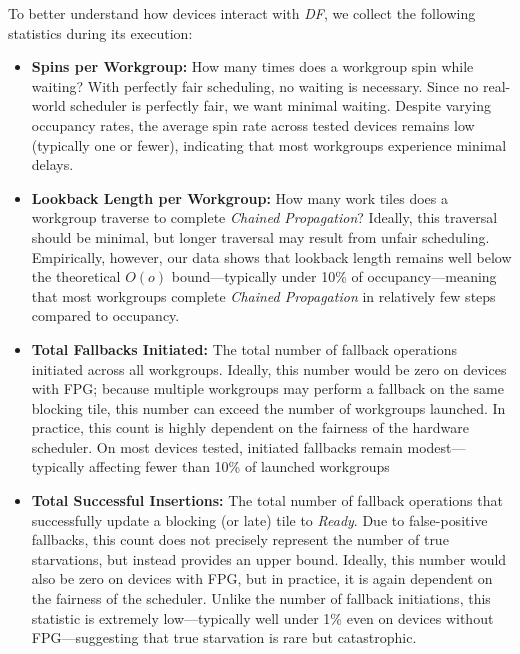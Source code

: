 \documentclass[sigconf,screen]{acmart}
\begin{document}
To better understand how devices interact with \emph{DF}, we collect the following statistics during its execution:
\begin{itemize}
  \item \textbf{Spins per Workgroup:} How many times does a workgroup spin while waiting? With perfectly fair scheduling, no waiting is necessary. Since no real-world scheduler is perfectly fair, we want minimal waiting. Despite varying occupancy rates, the average spin rate across tested devices remains low (typically one or fewer), indicating that most workgroups experience minimal delays.

  \item \textbf{Lookback Length per Workgroup:} How many work tiles does a workgroup traverse to complete \emph{Chained Propagation}? Ideally, this traversal should be minimal, but longer traversal may result from unfair scheduling. Empirically, however, our data shows that lookback length remains well below the theoretical $O(o)$ bound---typically under 10\% of occupancy---meaning that most workgroups complete \emph{Chained Propagation} in relatively few steps compared to occupancy.

  \item \textbf{Total Fallbacks Initiated:} The total number of fallback operations initiated across all workgroups. Ideally, this number would be zero on devices with FPG\@; because multiple workgroups may perform a fallback on the same blocking tile, this number can exceed the number of workgroups launched. In practice, this count is highly dependent on the fairness of the hardware scheduler. On most devices tested, initiated fallbacks remain modest---typically affecting fewer than 10\% of launched workgroups

  \item \textbf{Total Successful Insertions:} The total number of fallback operations that successfully update a blocking (or late) tile to \emph{Ready}. Due to false-positive fallbacks, this count does not precisely represent the number of true starvations, but instead provides an upper bound. Ideally, this number would also be zero on devices with FPG, but in practice, it is again dependent on the fairness of the scheduler. Unlike the number of fallback initiations, this statistic is extremely low---typically well under 1\% even on devices without FPG---suggesting that true starvation is rare but catastrophic.
\end{itemize}
\end{document}

